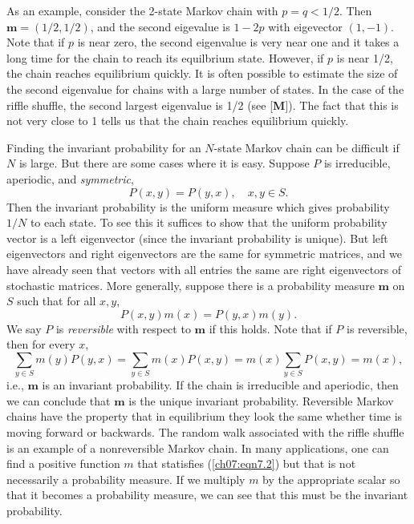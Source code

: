 \documentclass{stml-l}
\theoremstyle{definition}
\numberwithin{equation}{chapter}
\numberwithin{figure}{chapter}
\numberwithin{figure}{section}
\begin{document}
As an example, consider the 2-state Markov chain with $p=q< 1/2$.
Then $\mathbf{m}=(1/2,1/2)$, and the second eigevalue is $1-2p$
with eigevector $(1,-1)$. Note that if $p$ is near zero, the second
eigenvalue is very near one and it takes a long time for the chain
to reach its equilbrium state. However, if $p$ is near 1/2, the
chain reaches equilibrium quickly. It is often possible to estimate
the size of the second eigenvalue for chains with a large number of
states. In the case of the riffle shuffle, the second largest
eigenvalue is 1/2 (see [\textbf{M}]). The fact that this is not very
close to 1 tells us that the chain reaches equilibrium quickly.

Finding the invariant probability for an $N$-state Markov chain can
be difficult if $N$ is large. But there are some cases where it is
easy. Suppose $P$ is irreducible, aperiodic, and \emph{symmetric},
\begin{equation*}
P(x,y)=P(y,x),\quad x,y\in S.
\end{equation*}
Then the invariant probability is the uniform measure which gives
probability $1/N$ to each state. To see this it suffices to show
that the uniform probability vector is a left eigenvector (since the
invariant probability is unique). But left eigenvectors and right
eigenvectors are the same for symmetric matrices, and we have
already seen that vectors with all entries the same are right
eigenvectors of stochastic matrices. More generally, suppose there
is a probability measure $\mathbf{m}$ on $S$ such that for all
$x,y$,
\begin{equation}
\label{ch07:eqn7.2}P(x,y)m(x)=P(y,x)m(y).
\end{equation}
We say $P$ is \emph{reversible} with respect to $\mathbf{m}$ if this
holds. Note that if $P$ is reversible, then for every $x$,
\begin{equation*}
\sum\limits_{y\in S}m(y)P(y,x)=\sum\limits_{y\in
S}m(x)P(x,y)=m(x)\sum\limits_{y\in S}P(x,y)=m(x),
\end{equation*}
i.e., $\mathbf{m}$ is an invariant probability. If the chain is
irreducible and aperiodic, then we can conclude that $\mathbf{m}$ is
the unique invariant probability. Reversible Markov chains have the
property that in equilibrium they look the same whether time is
moving forward or backwards. The random walk associated with the
riffle shuffle is an example of a nonreversible Markov chain. In
many applications, one can find a positive function $m$ that
statisfies (\ref{ch07:eqn7.2}) but that is not necessarily a
probability measure. If we multiply $m$ by the appropriate scalar so
that it becomes a probability measure, we can see that this must be
the invariant probability.
\end{document}
